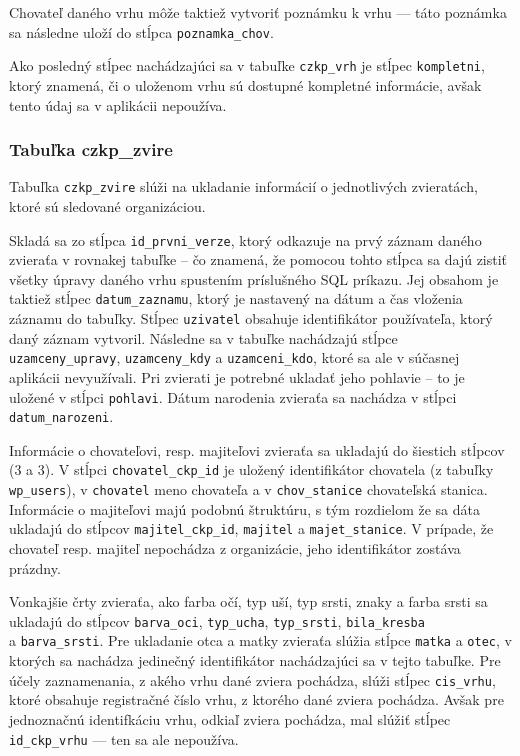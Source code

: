 Chovateľ daného vrhu môže taktiež vytvoriť poznámku k vrhu --- táto poznámka sa následne uloží do stĺpca \texttt{poznamka_chov}.

Ako posledný stĺpec nachádzajúci sa v tabuľke \texttt{czkp_vrh} je stĺpec \texttt{kompletni}, ktorý znamená, či o uloženom vrhu sú dostupné kompletné informácie, avšak tento údaj sa v aplikácii nepoužíva.

\subsubsection{Tabuľka czkp\_zvire}

Tabuľka \texttt{czkp_zvire} slúži na ukladanie informácií o jednotlivých zvieratách, ktoré sú sledované organizáciou.

Skladá sa zo stĺpca \texttt{id_prvni_verze}, ktorý odkazuje na prvý záznam daného zvieraťa v rovnakej tabuľke -- čo znamená, že pomocou tohto stĺpca sa dajú zistiť všetky úpravy daného vrhu spustením príslušného SQL príkazu.
Jej obsahom je taktiež stĺpec \texttt{datum_zaznamu}, ktorý je nastavený na dátum a čas vloženia záznamu do tabuľky. Stĺpec \texttt{uzivatel} obsahuje identifikátor používateľa, ktorý daný záznam vytvoril. Následne sa v tabuľke nachádzajú stĺpce \texttt{uzamceny_upravy}, \texttt{uzamceny_kdy} a \texttt{uzamceni_kdo}, ktoré sa ale v súčasnej aplikácii nevyužívali. Pri zvierati je potrebné ukladať jeho pohlavie -- to je uložené v stĺpci \texttt{pohlavi}. Dátum narodenia zvieraťa sa nachádza v stĺpci \texttt{datum_narozeni}.

Informácie o chovateľovi, resp. majiteľovi zvieraťa sa ukladajú do šiestich stĺpcov (3 a 3). V stĺpci \texttt{chovatel_ckp_id} je uložený identifikátor chovatela (z tabuľky \texttt{wp_users}), v \texttt{chovatel} meno chovateľa a v \texttt{chov_stanice} chovateľská stanica. Informácie o majiteľovi majú podobnú štruktúru, s tým rozdielom že sa dáta ukladajú do stĺpcov \texttt{majitel_ckp_id}, \texttt{majitel} a \texttt{majet_stanice}. V prípade, že chovateľ resp. majiteľ nepochádza z organizácie, jeho identifikátor zostáva prázdny.

Vonkajšie črty zvieraťa, ako farba očí, typ uší, typ srsti, znaky a farba srsti sa ukladajú do stĺpcov \texttt{barva_oci}, \texttt{typ_ucha}, \texttt{typ_srsti}, \texttt{bila_kresba} \\ a \texttt{barva_srsti}.
Pre ukladanie otca a matky zvieraťa slúžia stĺpce \texttt{matka} a \texttt{otec}, v ktorých sa nachádza jedinečný identifikátor nachádzajúci sa v tejto tabuľke. Pre účely zaznamenania, z akého vrhu dané zviera pochádza, slúži stĺpec \texttt{cis_vrhu}, ktoré obsahuje registračné číslo vrhu, z ktorého dané zviera pochádza. Avšak pre jednoznačnú identifkáciu vrhu, odkiaľ zviera pochádza, mal slúžiť stĺpec \texttt{id_ckp_vrhu} --- ten sa ale nepoužíva.

